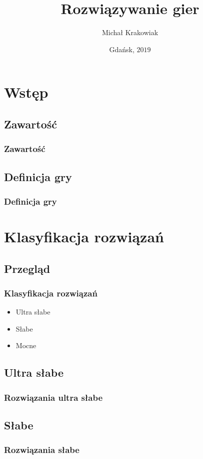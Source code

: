 \documentclass[polish,envcountsect,10pt]{beamer}
\title{Rozwiązywanie gier}
\author{Michał Krakowiak}
\date{Gdańsk, \texorpdfstring{$2019$}{2019}}
\begin{document}
    \frame{\titlepage}
    \section{Wstęp}
        \subsection{Zawartość}
            \begin{frame}
                \frametitle{Zawartość}
                \tableofcontents[pausesections]
            \end{frame}
        \subsection{Definicja gry}
            \begin{frame}
                \frametitle{Definicja gry}
            \end{frame}
    \section{Klasyfikacja rozwiązań}
        \subsection{Przegląd}
            \begin{frame}
                \frametitle{Klasyfikacja rozwiązań}
                \begin{itemize}
                    \item<1-> Ultra słabe
                    \item<2-> Słabe
                    \item<3-> Mocne
                \end{itemize}
            \end{frame}
        \subsection{Ultra słabe}
            \begin{frame}
                \frametitle{Rozwiązania ultra słabe}
            \end{frame}
        \subsection{Słabe}
            \begin{frame}
                \frametitle{Rozwiązania słabe}            
            \end{frame}
\end{document}
